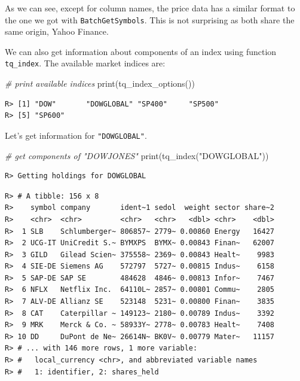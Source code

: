 \documentclass[
  12pt,
]{book}
\newenvironment{Shaded}{\begin{snugshade}}{\end{snugshade}}
\newcommand{\CommentTok}[1]{\textcolor[rgb]{0.37,0.37,0.37}{\textit{#1}}}
\newcommand{\FunctionTok}[1]{\textcolor[rgb]{0,0,0}{#1}}
\newcommand{\NormalTok}[1]{#1}
\newcommand{\StringTok}[1]{\textcolor[rgb]{0.5,0.5,0.5}{#1}}
\begin{document}
As we can see, except for column names, the price data has a similar format to the one we got with \texttt{BatchGetSymbols}. This is not surprising as both share the same origin, Yahoo Finance.

We can also get information about components of an index using function \texttt{tq\_index}. The available market indices are:  

\begin{Shaded}
\begin{Highlighting}[]
\CommentTok{\# print available indices}
\FunctionTok{print}\NormalTok{(}\FunctionTok{tq\_index\_options}\NormalTok{())}
\end{Highlighting}
\end{Shaded}

\begin{verbatim}
R> [1] "DOW"       "DOWGLOBAL" "SP400"     "SP500"    
R> [5] "SP600"
\end{verbatim}

Let's get information for \texttt{"DOWGLOBAL"}.

\begin{Shaded}
\begin{Highlighting}[]
\CommentTok{\# get components of "DOWJONES"}
\FunctionTok{print}\NormalTok{(}\FunctionTok{tq\_index}\NormalTok{(}\StringTok{"DOWGLOBAL"}\NormalTok{))}
\end{Highlighting}
\end{Shaded}

\begin{verbatim}
R> Getting holdings for DOWGLOBAL
\end{verbatim}

\begin{verbatim}
R> # A tibble: 156 x 8
R>    symbol company       ident~1 sedol  weight sector share~2
R>    <chr>  <chr>         <chr>   <chr>   <dbl> <chr>    <dbl>
R>  1 SLB    Schlumberger~ 806857~ 2779~ 0.00860 Energy   16427
R>  2 UCG-IT UniCredit S.~ BYMXPS  BYMX~ 0.00843 Finan~   62007
R>  3 GILD   Gilead Scien~ 375558~ 2369~ 0.00843 Healt~    9983
R>  4 SIE-DE Siemens AG    572797  5727~ 0.00815 Indus~    6158
R>  5 SAP-DE SAP SE        484628  4846~ 0.00813 Infor~    7467
R>  6 NFLX   Netflix Inc.  64110L~ 2857~ 0.00801 Commu~    2805
R>  7 ALV-DE Allianz SE    523148  5231~ 0.00800 Finan~    3835
R>  8 CAT    Caterpillar ~ 149123~ 2180~ 0.00789 Indus~    3392
R>  9 MRK    Merck & Co. ~ 58933Y~ 2778~ 0.00783 Healt~    7408
R> 10 DD     DuPont de Ne~ 26614N~ BK0V~ 0.00779 Mater~   11157
R> # ... with 146 more rows, 1 more variable:
R> #   local_currency <chr>, and abbreviated variable names
R> #   1: identifier, 2: shares_held
\end{verbatim}
\end{document}
